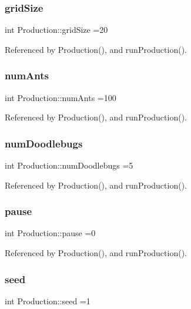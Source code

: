 \subsubsection{grid\+Size}
{\footnotesize\ttfamily int Production\+::grid\+Size =20}



Referenced by Production(), and run\+Production().

\mbox{\label{classProduction_a9bf1f5e66a3a787f08d37d5ef06cf8b6}} 
\subsubsection{num\+Ants}
{\footnotesize\ttfamily int Production\+::num\+Ants =100}



Referenced by Production(), and run\+Production().

\mbox{\label{classProduction_a3bfd9e01f9f73efd1f92176e5f7458eb}} 
\subsubsection{num\+Doodlebugs}
{\footnotesize\ttfamily int Production\+::num\+Doodlebugs =5}



Referenced by Production(), and run\+Production().

\mbox{\label{classProduction_af570feb7415a4d5b1a9176dacd9d6b64}} 
\subsubsection{pause}
{\footnotesize\ttfamily int Production\+::pause =0}



Referenced by Production(), and run\+Production().

\mbox{\label{classProduction_adb474287b0143fccb9d440ccc54ba624}} 
\subsubsection{seed}
{\footnotesize\ttfamily int Production\+::seed =1}




